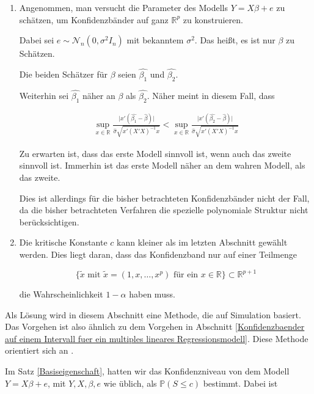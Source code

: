 \documentclass[12pt,a4paper]{article}
\theoremstyle{definition}
\theoremstyle{definition}
\theoremstyle{definition}
\theoremstyle{definition}
\begin{document}
\begin{enumerate}
\item Angenommen, man versucht die Parameter des Modells $Y=X\beta+e$ zu schätzen, um Konfidenzbänder auf ganz $\mathbb{R}^p$ zu konstruieren. 

Dabei sei $e \sim \mathscr{N}_{n}(0,\sigma^2 I_n)$ mit bekanntem $\sigma^2$. Das heißt, es ist nur $\beta$ zu Schätzen.

Die beiden Schätzer für $\beta$ seien $\hat{\beta_1}$ und $\hat{\beta_2}$. 

Weiterhin sei $\hat{\beta_1}$ näher an $\beta$ als $\hat{\beta_2}$. Näher meint in diesem Fall, dass

\begin{align*}
\sup_{x \in \mathbb{R}} \frac{\vert x'(\hat{\beta_1} - \hat{\beta}) \vert}{\hat{\sigma} \sqrt{x'(X'X)^{-1}x}} < 
\sup_{x \in \mathbb{R}} \frac{\vert x'(\hat{\beta_2} - \hat{\beta}) \vert}{\hat{\sigma} \sqrt{x'(X'X)^{-1}x}}
\end{align*}

Zu erwarten ist, dass das erste Modell sinnvoll ist, wenn auch das zweite sinnvoll ist. Immerhin ist das erste Modell näher an dem wahren Modell, als das zweite.

Dies ist allerdings für die bisher betrachteten Konfidenzbänder nicht der Fall, da die bisher betrachteten Verfahren die spezielle polynomiale Struktur nicht berücksichtigen. 

\item Die kritische Konstante $c$ kann kleiner als im letzten Abschnitt gewählt werden. Dies liegt daran, dass das Konfidenzband nur auf einer Teilmenge 

\begin{equation*}
\{ \tilde{x} \text{ mit } \tilde{x}=(1,x,\ldots,x^p) \text{ für ein } x \in \mathbb{R}\} \subset \mathbb{R}^{p+1}
\end{equation*}

die Wahrscheinlichkeit $1-\alpha$ haben muss.
\end{enumerate}

Als Lösung wird in diesem Abschnitt eine Methode, die auf Simulation basiert. Das Vorgehen ist also ähnlich zu dem Vorgehen in Abschnitt \ref{Konfidenzbaender auf einem Intervall fuer ein multiples lineares Regressionsmodell}. Diese Methode orientiert sich an \cite[183,184]{Liu64}.

Im Satz \ref{Basiseigenschaft}, hatten wir das Konfidenzniveau von dem Modell $Y=X\beta+e$, mit $Y,X,\beta,e$ wie üblich, als $\mathbb{P}(S \leq c)$ bestimmt. Dabei ist
\end{document}
